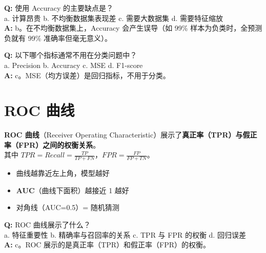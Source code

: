 \documentclass[11pt,a4paper]{article}
\begin{document}
\begin{examplebox}
\textbf{Q:} 使用 Accuracy 的主要缺点是？\\
a. 计算昂贵 \quad b. 不均衡数据集表现差 \quad c. 需要大数据集 \quad d. 需要特征缩放\\
\textbf{A:} b。在不均衡数据集上，Accuracy 会产生误导（如 99\% 样本为负类时，全预测负就有 99\% 准确率但毫无意义）。
\end{examplebox}

\begin{examplebox}[例题：非分类指标]
\textbf{Q:} 以下哪个指标通常不用在分类问题中？\\
a. Precision \quad b. Accuracy \quad c. MSE \quad d. F1-score\\
\textbf{A:} c。MSE（均方误差）是回归指标，不用于分类。
\end{examplebox}

\section{ROC 曲线}

\begin{bluebox}
\textbf{ROC 曲线}（Receiver Operating Characteristic）展示了\textbf{真正率（TPR）与假正率（FPR）之间的权衡关系}。\\
其中 $TPR = Recall = \frac{TP}{TP+FN}$，$FPR = \frac{FP}{FP+TN}$。
\end{bluebox}

\begin{orangebox}
\begin{itemize}
    \item 曲线越靠近左上角，模型越好
    \item \textbf{AUC}（曲线下面积）越接近 1 越好
    \item 对角线（AUC=0.5）= 随机猜测
\end{itemize}
\end{orangebox}

\begin{examplebox}
\textbf{Q:} ROC 曲线展示了什么？\\
a. 特征重要性 \quad b. 精确率与召回率的关系 \quad c. TPR 与 FPR 的权衡 \quad d. 回归误差\\
\textbf{A:} c。ROC 展示的是真正率（TPR）和假正率（FPR）的权衡。
\end{examplebox}
\end{document}
